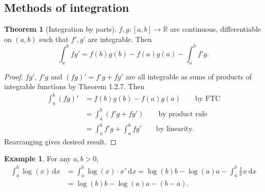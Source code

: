 \documentclass[a4paper]{article}
\theoremstyle{definition}
\newtheorem{thm}[defn]{Theorem}
\newtheorem{example}[defn]{Example}
\begin{document}
\subsection{Methods of integration}
\begin{thm}[Integration by parts]
$f,g:[a,b]\rightarrow \mathbb R$ are continuous, differentiable on $(a,b)$ such that $f',g'$ are integrable. Then
\[
\int_a^b fg' = f(b)g(b)-f(a)g(a)-\int_a^b f'g .
\]
\end{thm}
\begin{proof}
$fg'$, $f'g$ and $(fg)'=f'g+fg'$ are all integrable as sums of products of integrable functions by Theorem 1.2.7. Then
\[
\begin{aligned}
    \int_a^b (fg)'&=f(b)g(b)-f(a)g(a) \qquad \text{by FTC}\\
    &=\int_a^b (f'g+fg') \qquad \text{by product rule} \\
    &=\int_a^b f'g + \int_a^b fg'\qquad \text{by linearity} .
\end{aligned}
\]
Rearranging gives desired result.
\end{proof}

\begin{example}
For any $a,b>0$,
\[
\begin{aligned}
    \int_a^b \log (x) \ \mathrm d x&=\int_a^b \log (x)\cdot x' \ \mathrm d x = \log (b)b-\log(a)a-\int_a^b \frac1x x \ \mathrm d x \\& = \log(b)b-\log(a)a-(b-a).
\end{aligned}
\]
\end{example}
\end{document}

